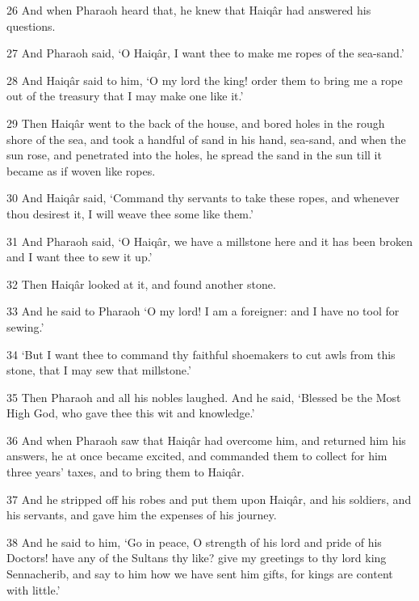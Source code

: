 \par 26 And when Pharaoh heard that, he knew that Haiqâr had answered his questions.

\par 27 And Pharaoh said, ‘O Haiqâr, I want thee to make me ropes of the sea-sand.’

\par 28 And Haiqâr said to him, ‘O my lord the king! order them to bring me a rope out of the treasury that I may make one like it.’

\par 29 Then Haiqâr went to the back of the house, and bored holes in the rough shore of the sea, and took a handful of sand in his hand, sea-sand, and when the sun rose, and penetrated into the holes, he spread the sand in the sun till it became as if woven like ropes.

\par 30 And Haiqâr said, ‘Command thy servants to take these ropes, and whenever thou desirest it, I will weave thee some like them.’

\par 31 And Pharaoh said, ‘O Haiqâr, we have a millstone here and it has been broken and I want thee to sew it up.’

\par 32 Then Haiqâr looked at it, and found another stone.

\par 33 And he said to Pharaoh ‘O my lord! I am a foreigner: and I have no tool for sewing.’

\par 34 ‘But I want thee to command thy faithful shoemakers to cut awls from this stone, that I may sew that millstone.’

\par 35 Then Pharaoh and all his nobles laughed. And he said, ‘Blessed be the Most High God, who gave thee this wit and knowledge.’

\par 36 And when Pharaoh saw that Haiqâr had overcome him, and returned him his answers, he at once became excited, and commanded them to collect for him three years' taxes, and to bring them to Haiqâr.

\par 37 And he stripped off his robes and put them upon Haiqâr, and his soldiers, and his servants, and gave him the expenses of his journey.

\par 38 And he said to him, ‘Go in peace, O strength of his lord and pride of his Doctors! have any of the Sultans thy like? give my greetings to thy lord king Sennacherib, and say to him how we have sent him gifts, for kings are content with little.’

